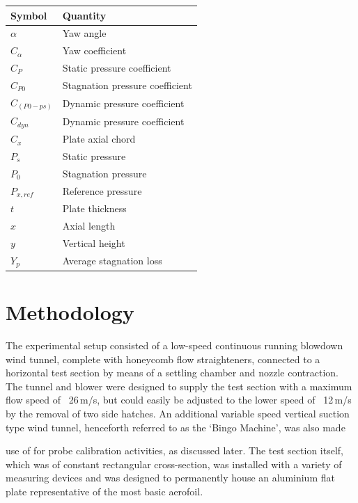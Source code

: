 \documentclass[11pt,a4paper,twocolumn]{article}
\begin{document}
\begin{table}[!ht]
\begin{center}
{\setlength{\extrarowheight}{1.5pt}
\begin{tabularx}{\columnwidth}{l X} \hline \hline
Symbol & Quantity \\ \hline
$\alpha$ & Yaw angle\\
$C_{\alpha}$ & Yaw coefficient \\
$C_{P}$ & Static pressure coefficient \\
$C_{P0}$ & Stagnation pressure coefficient \\
$C_{(P0-ps)}$ & Dynamic pressure coefficient \\
$C_{dyn}$ & Dynamic pressure coefficient \\
$C_{x}$ & Plate axial chord \\
$P_{s}$ & Static pressure \\
$P_{0}$ & Stagnation pressure \\
$P_{x,ref}$ & Reference pressure \\
$t$ & Plate thickness \\
$x$ & Axial length \\
$y$ & Vertical height \\
$Y_p$ & Average stagnation loss \\
\end{tabularx}}
\end{center}
\end{table}

\section{Methodology}
The experimental setup consisted of a low-speed continuous running blowdown wind tunnel, complete with honeycomb flow straighteners, connected to a horizontal test section by means of a settling chamber and nozzle contraction. The tunnel and blower were designed to supply the test section with a maximum flow speed of ~26\,m/s, but could easily be adjusted to the lower speed of ~12\,m/s by the removal of two side hatches. An additional variable speed vertical suction type wind tunnel, henceforth referred to as the ‘Bingo Machine’, was also made \vfill\null
\columnbreak

\vspace*{18mm}
use of for probe calibration activities, as discussed later. The test section itself, which was of constant rectangular cross-section, was installed with a variety of measuring devices and was designed to permanently house an aluminium flat plate representative of the most basic aerofoil. 
\end{document}
